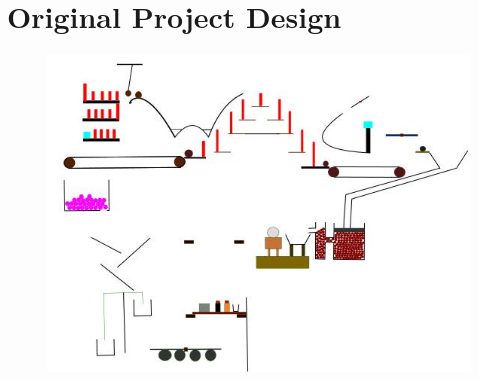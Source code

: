 \section{Original Project Design}

\begin{figure}[h]
	\begin{center}
	\includegraphics{./doc/pd.jpg}
	\end{center}
\end{figure}


